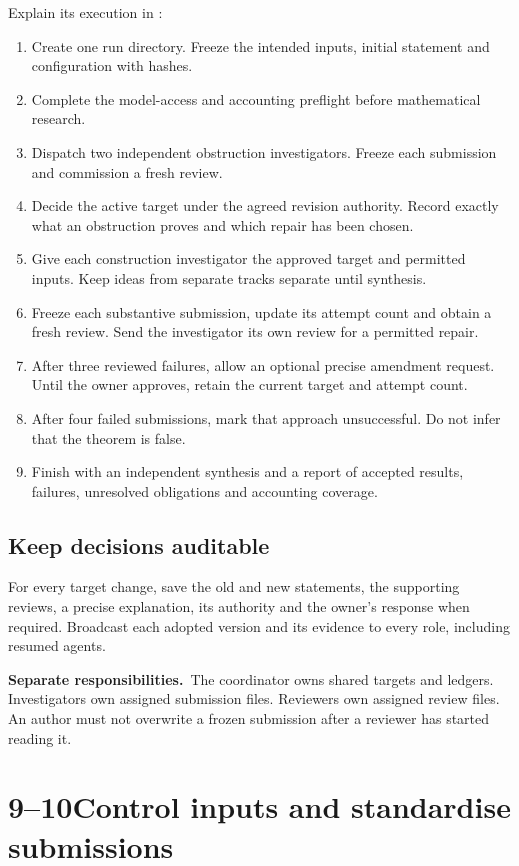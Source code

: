 \documentclass[11pt,a4paper]{article}
\newcommand{\pathcode}[1]{\texttt{\small\detokenize{#1}}}
\newcommand{\step}[2]{\section*{#1\quad #2}}
\newcommand{\note}[2]{\par\smallskip\noindent\colorbox{paperblue}{\parbox{\dimexpr\linewidth-2\fboxsep\relax}{\textbf{#1}\ #2}}\par\smallskip}
\begin{document}
Explain its execution in \pathcode{instructions/coordinator.md}:
\begin{enumerate}
\item Create one run directory. Freeze the intended inputs, initial statement and configuration with hashes.
\item Complete the model-access and accounting preflight before mathematical research.
\item Dispatch two independent obstruction investigators. Freeze each submission and commission a fresh review.
\item Decide the active target under the agreed revision authority. Record exactly what an obstruction proves and which repair has been chosen.
\item Give each construction investigator the approved target and permitted inputs. Keep ideas from separate tracks separate until synthesis.
\item Freeze each substantive submission, update its attempt count and obtain a fresh review. Send the investigator its own review for a permitted repair.
\item After three reviewed failures, allow an optional precise amendment request. Until the owner approves, retain the current target and attempt count.
\item After four failed submissions, mark that approach unsuccessful. Do not infer that the theorem is false.
\item Finish with an independent synthesis and a report of accepted results, failures, unresolved obligations and accounting coverage.
\end{enumerate}

\subsection*{Keep decisions auditable}
For every target change, save the old and new statements, the supporting reviews, a precise explanation, its authority and the owner's response when required. Broadcast each adopted version and its evidence to every role, including resumed agents.

\note{Separate responsibilities.}{The coordinator owns shared targets and ledgers. Investigators own assigned submission files. Reviewers own assigned review files. An author must not overwrite a frozen submission after a reviewer has started reading it.}
\newpage

\step{9--10}{Control inputs and standardise submissions}
\end{document}
